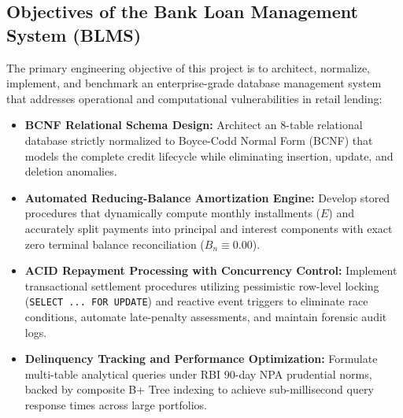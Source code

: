 \documentclass[11pt,a4paper]{report}
\begin{document}
\subsection{Objectives of the Bank Loan Management System (BLMS)}
The primary engineering objective of this project is to architect, normalize, implement, and benchmark an enterprise-grade database management system that addresses operational and computational vulnerabilities in retail lending:
\begin{itemize}
    \item \textbf{BCNF Relational Schema Design:} Architect an 8-table relational database strictly normalized to Boyce-Codd Normal Form (BCNF) that models the complete credit lifecycle while eliminating insertion, update, and deletion anomalies.
    \item \textbf{Automated Reducing-Balance Amortization Engine:} Develop stored procedures that dynamically compute monthly installments ($E$) and accurately split payments into principal and interest components with exact zero terminal balance reconciliation ($B_n \equiv 0.00$).
    \item \textbf{ACID Repayment Processing with Concurrency Control:} Implement transactional settlement procedures utilizing pessimistic row-level locking (\texttt{SELECT ... FOR UPDATE}) and reactive event triggers to eliminate race conditions, automate late-penalty assessments, and maintain forensic audit logs.
    \item \textbf{Delinquency Tracking and Performance Optimization:} Formulate multi-table analytical queries under RBI 90-day NPA prudential norms, backed by composite B+ Tree indexing to achieve sub-millisecond query response times across large portfolios.
\end{itemize}
\end{document}
